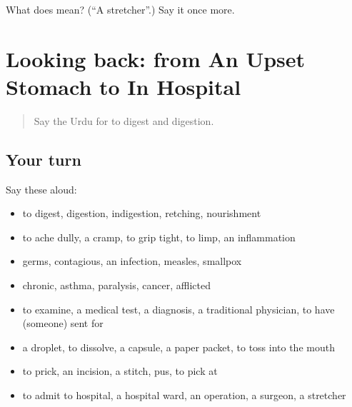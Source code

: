 \begin{tcolorbox}[breakable,colback=teal!4,colframe=teal!35!black,title={Before you move on}]
What does  mean? (\textquotedblleft{}A stretcher\textquotedblright{}.) Say it once more.
\end{tcolorbox}
\section[(dialogue)]{Looking back: from An Upset Stomach to In Hospital}

\label{lesson:UR-R479-review-472-479}



\begin{quote}
Say the Urdu for to digest and digestion.
\end{quote}

\subsection*{Your turn}
Say these aloud:

\begin{itemize}
\raggedright
  \item to digest, digestion, indigestion, retching, nourishment
  \item to ache dully, a cramp, to grip tight, to limp, an inflammation
  \item germs, contagious, an infection, measles, smallpox
  \item chronic, asthma, paralysis, cancer, afflicted
  \item to examine, a medical test, a diagnosis, a traditional physician, to have (someone) sent for
  \item a droplet, to dissolve, a capsule, a paper packet, to toss into the mouth
  \item to prick, an incision, a stitch, pus, to pick at
  \item to admit to hospital, a hospital ward, an operation, a surgeon, a stretcher
\end{itemize}

